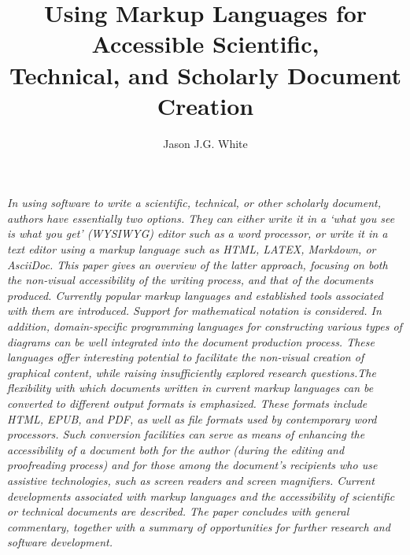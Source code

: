 \documentclass[11pt]{sig-alternate}
\makeatletter
\let\oldabstract\abstract
\let\oldendabstract\endabstract
\renewenvironment{abstract}
{\renewenvironment{quotation}%
               {\list{}{\addtolength{\leftmargin}{1em} %
                        \listparindent 1.5em%
                        \itemindent    \listparindent%
                        \rightmargin   \leftmargin%
                        \parsep        \z@ \@plus\p@}%
                \item\relax}%
               {\endlist}%
\oldabstract}
{\oldendabstract}
\makeatother
\begin{document}
\title{Using Markup Languages for Accessible Scientific, \\Technical, and
Scholarly Document Creation}

\author[1]{\large \color{blue} Jason J.G. White}


\toappear{}

\maketitle
\begin{@twocolumnfalse} 

\begin{abstract}
\begin{large}
\item 
\textit{In using software to write a scientific, technical, or other scholarly document, authors have essentially two options. They can either write it in a ‘what you see is what you get’ (WYSIWYG) editor such as a word processor, or write it in a text editor using a markup language such as HTML, LATEX, Markdown, or AsciiDoc. This paper gives an overview of the latter approach, focusing on both the non-visual accessibility of the writing process, and that of the documents produced. Currently popular markup languages and established tools associated with them are introduced. Support for mathematical notation is considered. In addition, domain-specific programming languages for constructing various types of diagrams can be well integrated into the document production process. These languages offer interesting potential to facilitate the non-visual creation of graphical content, while raising insufficiently explored research questions.The flexibility with which documents written in current markup languages can be converted to different output formats is emphasized. These formats include HTML, EPUB, and PDF, as well as file formats used by contemporary word processors. Such conversion facilities can serve as means of enhancing the accessibility of a document both for the author (during the editing and proofreading process) and for those among the document’s recipients who use assistive technologies, such as screen readers and screen magnifiers. Current developments associated with markup languages and the accessibility of scientific or technical documents are described. The paper concludes with general commentary, together with a summary of opportunities for further research and software development.}
\end{large}
\end{abstract}
\end{@twocolumnfalse}
\end{document}
